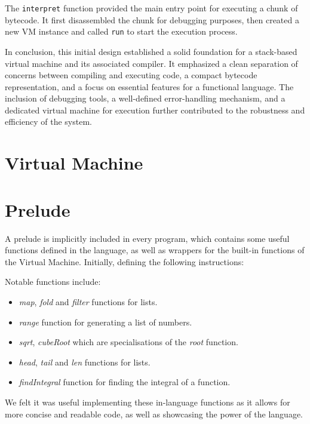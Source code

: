 The \texttt{interpret} function provided the main entry point for executing a chunk of bytecode. It first disassembled the chunk for debugging purposes, then created a new VM instance and called \texttt{run} to start the execution process.

In conclusion, this initial design established a solid foundation for a stack-based virtual machine and its associated compiler. It emphasized a clean separation of concerns between compiling and executing code, a compact bytecode representation, and a focus on essential features for a functional language. The inclusion of debugging tools, a well-defined error-handling mechanism, and a dedicated virtual machine for execution further contributed to the robustness and efficiency of the system.

\section{Virtual Machine}\label{sec:virtual-machine}

\section{Prelude}\label{sec:prelude}

A prelude is implicitly included in every program, which contains some useful functions defined in the language, as 
well as wrappers for the built-in functions of the Virtual Machine. Initially, defining the following instructions:

Notable functions include:

\begin{itemize}
    \item \textit{map}, \textit{fold} and \textit{filter} functions for lists.
    \item \textit{range} function for generating a list of numbers.
    \item \textit{sqrt}, \textit{cubeRoot} which are specialisations of the \textit{root} function.
    \item \textit{head}, \textit{tail} and \textit{len} functions for lists.
    \item \textit{findIntegral} function for finding the integral of a function.
\end{itemize}

We felt it was useful implementing these in-language functions as it allows for more concise and readable code, as
well as showcasing the power of the language.

